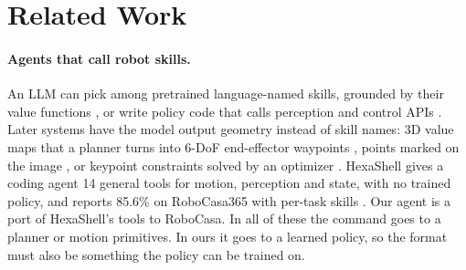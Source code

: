 \section{Related Work}
\label{sec:related}


\paragraph{Agents that call robot skills.}
An LLM can pick among pretrained language-named skills, grounded by their
value functions \citep{ahn2022saycan}, %
or write policy code that calls perception and control APIs
\citep{liang2022cap}. %
Later systems have the model output geometry instead of skill names: 3D value
maps that a planner turns into 6-DoF end-effector waypoints
\citep{huang2023voxposer}, %
points marked on the image \citep{liu2024moka}, %
or keypoint constraints solved by an optimizer \citep{huang2024rekep}.
HexaShell gives a coding agent 14 general tools for motion, perception and
state, with no trained policy, and reports 85.6\% on RoboCasa365 with
per-task skills \citep{gao2026hexashell,hexashellrepo,robocasa365leaderboard}.
Our agent is a port of HexaShell's tools to RoboCasa. In all of these the
command goes to a planner or motion primitives. In ours it goes to a learned
policy, so the format must also be something the policy can be trained on.

